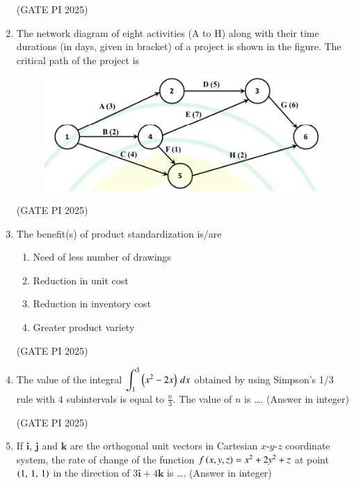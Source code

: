 \documentclass[journal,12pt,onecolumn]{IEEEtran}
\theoremstyle{remark}
\begin{document}
\begin{enumerate}
\hfill (GATE PI 2025)

\item The network diagram of eight activities (A to H) along with their time durations (in days, given in bracket) of a project is shown in the figure. The critical path of the project is

\begin{figure}[H]
\centering
\includegraphics[width=0.5\columnwidth]{fig5.png}
\caption{}
\end{figure}

\begin{enumerate}
\end{enumerate}

\hfill (GATE PI 2025)

\item The benefit(s) of product standardization is/are

\begin{enumerate}
\item Need of less number of drawings
\item Reduction in unit cost
\item Reduction in inventory cost
\item Greater product variety
\end{enumerate}

\hfill (GATE PI 2025)

\item The value of the integral $\displaystyle \int_{1}^{3} \left(x^{2}-2x\right)\,dx$ obtained by using Simpson's 1/3 rule with $4$ subintervals is equal to $\frac{n}{3}$. The value of $n$ is \dots. (Answer in integer)

\hfill (GATE PI 2025)

\item If $\mathbf{i}$, $\mathbf{j}$ and $\mathbf{k}$ are the orthogonal unit vectors in Cartesian $x$-$y$-$z$ coordinate system, the rate of change of the function $f\left(x,y,z\right)=x^{2}+2y^{2}+z$ at point $\left(1,\,1,\,1\right)$ in the direction of $3\mathbf{i}+4\mathbf{k}$ is \dots. (Answer in integer)


\end{enumerate}
\end{document}
